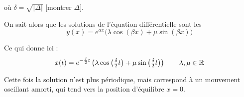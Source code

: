 où $\delta = \sqrt{|\Delta|}$ [montrer $\Delta$].

\change
On sait alors que les solutions de l'équation différentielle 
sont les 
$$y(x) = e^{\alpha x}\big(\lambda\cos (\beta x)+\mu\sin (\beta x)\big)$$

\change
Ce qui donne ici :
$$x(t) = e^{-\frac{f}{2} t}\left(\lambda\cos \left(\tfrac{\delta}{2}t\right)
+\mu\sin \left(\tfrac{\delta}{2}t\right)\right)\qquad \lambda, \mu \in \mathbb{R}$$


\diapo

Cette fois la solution n'est plus périodique, 
mais correspond à un mouvement 
oscillant amorti, qui tend vers la position d'équilibre $x=0$.


\diapo

\change




